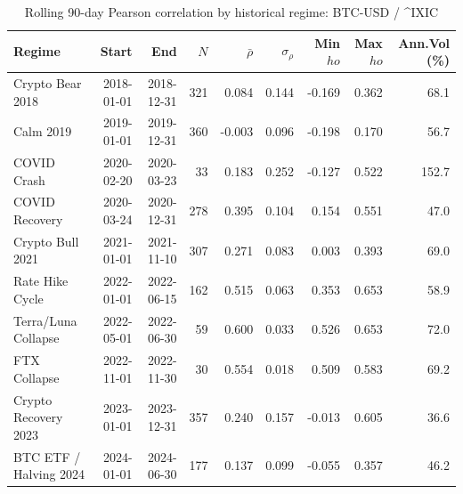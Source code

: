 \begin{table}[H]
\centering
\small
\caption{Rolling 90-day Pearson correlation by historical regime: BTC-USD / ^IXIC}
\label{tab:regime_corr_BTCUSDIXIC}
\begin{tabular}{lrrrrrrrr}
\toprule
Regime & Start & End & $N$ & $\bar{\rho}$ & $\sigma_\rho$ & Min $
ho$ & Max $
ho$ & Ann.Vol (\%) \\
\midrule
Crypto Bear 2018 & 2018-01-01 & 2018-12-31 & 321 & 0.084 & 0.144 & -0.169 & 0.362 & 68.1 \\
Calm 2019 & 2019-01-01 & 2019-12-31 & 360 & -0.003 & 0.096 & -0.198 & 0.170 & 56.7 \\
COVID Crash & 2020-02-20 & 2020-03-23 & 33 & 0.183 & 0.252 & -0.127 & 0.522 & 152.7 \\
COVID Recovery & 2020-03-24 & 2020-12-31 & 278 & 0.395 & 0.104 & 0.154 & 0.551 & 47.0 \\
Crypto Bull 2021 & 2021-01-01 & 2021-11-10 & 307 & 0.271 & 0.083 & 0.003 & 0.393 & 69.0 \\
Rate Hike Cycle & 2022-01-01 & 2022-06-15 & 162 & 0.515 & 0.063 & 0.353 & 0.653 & 58.9 \\
Terra/Luna Collapse & 2022-05-01 & 2022-06-30 & 59 & 0.600 & 0.033 & 0.526 & 0.653 & 72.0 \\
FTX Collapse & 2022-11-01 & 2022-11-30 & 30 & 0.554 & 0.018 & 0.509 & 0.583 & 69.2 \\
Crypto Recovery 2023 & 2023-01-01 & 2023-12-31 & 357 & 0.240 & 0.157 & -0.013 & 0.605 & 36.6 \\
BTC ETF / Halving 2024 & 2024-01-01 & 2024-06-30 & 177 & 0.137 & 0.099 & -0.055 & 0.357 & 46.2 \\
\bottomrule
\end{tabular}
\end{table}